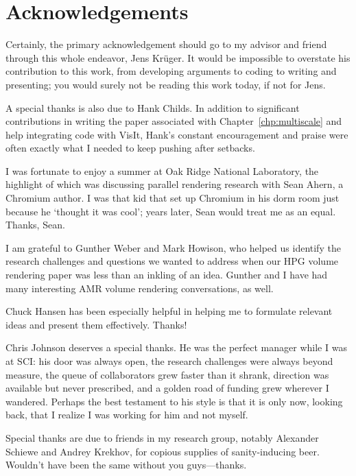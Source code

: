 \section*{Acknowledgements}

Certainly, the primary acknowledgement should go to my advisor and
friend through this whole endeavor, Jens Kr\"uger.  It would be
impossible to overstate his contribution to this work, from developing
arguments to coding to writing and presenting; you would surely not be
reading this work today, if not for Jens.

A special thanks is also due to Hank Childs.  In addition to
significant contributions in writing the paper associated with
Chapter~\ref{chp:multiscale} and help integrating code with VisIt,
Hank's constant encouragement and praise were often exactly what I
needed to keep pushing after setbacks.

I was fortunate to enjoy a summer at Oak Ridge National Laboratory,
the highlight of which was discussing parallel rendering research with
Sean Ahern, a Chromium author.  I was that kid that set up Chromium in
his dorm room just because he `thought it was cool'; years later, Sean
would treat me as an equal.  Thanks, Sean.

I am grateful to Gunther Weber and Mark Howison, who helped us identify
the research challenges and questions we wanted to address when our HPG
volume rendering paper was less than an inkling of an idea.  Gunther
and I have had many interesting AMR volume rendering conversations, as
well.

Chuck Hansen has been especially helpful in helping me to formulate
relevant ideas and present them effectively.  Thanks!


Chris Johnson deserves a special thanks.  He was the perfect manager
while I was at SCI: his door was always open, the research challenges
were always beyond measure, the queue of collaborators grew faster than
it shrank, direction was available but never prescribed, and a golden
road of funding grew wherever I wandered.  Perhaps the best testament
to his style is that it is only now, looking back, that I realize I was
working for him and not myself.

Special thanks are due to friends in my research group, notably
Alexander Schiewe and Andrey Krekhov, for copious supplies of
sanity-inducing beer.  Wouldn't have been the same without you
guys---thanks.

